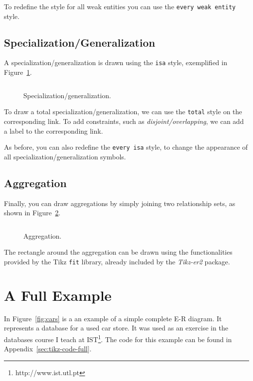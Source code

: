 \documentclass[12pt]{article}
\newcommand{\demo}[1]{
  \bigskip
  \begin{minipage}{\linewidth}
      \begin{center}
          
      \end{center}
      \begin{center}
          \scriptsize
          \inputminted{latex}{snippets/#1.tex}
      \end{center}
  \end{minipage}
}
\begin{document}
To redefine the style for all weak entities you can use the \texttt{every weak
  entity} style.

%

\subsection{Specialization/Generalization}
\label{sec:spec}

A specialization/generalization is drawn using the \texttt{isa} style,
exemplified in Figure~\ref{fig:isa}.

\begin{figure}[htb!]
    \centering
    \demo{isa}
    \caption{Specialization/generalization.}
\label{fig:isa}
\end{figure}

To draw a total specialization/generalization, we can use the \texttt{total}
style on the corresponding link.  To add constraints, such as
\emph{disjoint/overlapping}, we can add a label to the corresponding link.

As before, you can also redefine the \texttt{every isa} style, to change the
appearance of all specialization/generalization symbols.

\subsection{Aggregation}
\label{sec:aggregation}

Finally, you can draw aggregations by simply joining two relationship sets, as
shown in Figure~\ref{fig:aggregation}.

\begin{figure}[htb!]
    \centering
    \demo{aggregation}
    \caption{Aggregation.}
    \label{fig:aggregation}
\end{figure}

The rectangle around the aggregation can be drawn using the functionalities
provided by the Tikz \texttt{fit} library, already included by the
\emph{Tikz-er2} package.

\section{A Full Example}
\label{sec:full-example}

In Figure~\ref{fig:cars} is a an example of a simple complete E-R diagram. It
represents a database for a used car store. It was used as an exercise in the
databases course I teach at IST\footnote{http://www.ist.utl.pt}. The code for
this example can be found in Appendix~\ref{sec:tikz-code-full}.
\end{document}
